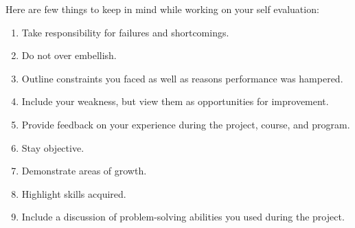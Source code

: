 \documentclass[11pt, oneside]{article}   	%
\begin{document}
Here are few things to keep in mind while working on your self evaluation:
\begin{enumerate}
\item Take responsibility for failures and shortcomings.
\item Do not over embellish.
\item Outline constraints you faced as well as reasons performance was hampered.
\item Include your weakness, but view them as opportunities for improvement.
\item Provide feedback on your experience during the project, course, and program.
\item Stay objective.
\item Demonstrate areas of growth.
\item Highlight skills acquired.
\item Include a discussion of problem-solving abilities you used during the project.
\end{enumerate}



\end{document}

